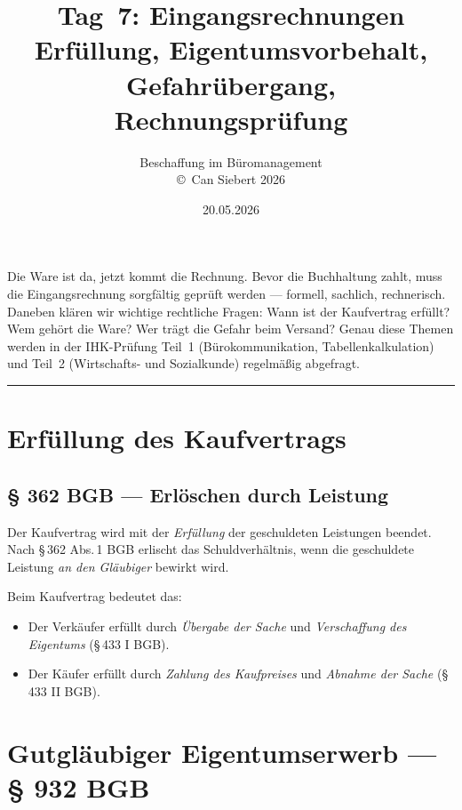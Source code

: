 \documentclass[11pt, a4paper]{article}
\title{\vspace*{-1.5cm}\Huge\bfseries\color{bfwPrimaryDark}Tag~7: Eingangsrechnungen\\[0.4em]
  \large\color{bfwInkSoft}\textnormal{Erfüllung, Eigentumsvorbehalt, Gefahrübergang, Rechnungsprüfung}}
\author{\textsf{Beschaffung im Büromanagement}\\
\textsf{\small\copyright\ Can Siebert\,\textperiodcentered\,2026}}
\date{20.05.2026}
\begin{document}
\maketitle
\thispagestyle{empty}

\vspace{1em}
\begin{merksatz}[title={\bfseries Worum geht es heute?}]
Die Ware ist da, jetzt kommt die Rechnung. Bevor die Buchhaltung zahlt, muss die
Eingangsrechnung sorgfältig geprüft werden --- formell, sachlich, rechnerisch.
Daneben klären wir wichtige rechtliche Fragen: Wann ist der Kaufvertrag erfüllt?
Wem gehört die Ware? Wer trägt die Gefahr beim Versand? Genau diese Themen werden
in der IHK-Prüfung Teil~1 (Bürokommunikation, Tabellenkalkulation) und Teil~2
(Wirtschafts- und Sozialkunde) regelmäßig abgefragt.
\end{merksatz}

\tableofcontents
\vspace{1em}
\hrule
\vspace{1em}

\section{Erfüllung des Kaufvertrags}

\subsection{§ 362 BGB --- Erlöschen durch Leistung}

Der Kaufvertrag wird mit der \emph{Erfüllung} der geschuldeten Leistungen beendet.
Nach §\,362 Abs.\,1 BGB erlischt das Schuldverhältnis, wenn die geschuldete Leistung
\emph{an den Gläubiger} bewirkt wird.

Beim Kaufvertrag bedeutet das:

\begin{itemize}[itemsep=2pt]
  \item Der Verkäufer erfüllt durch \emph{Übergabe der Sache} und \emph{Verschaffung des Eigentums} (§\,433 I BGB).
  \item Der Käufer erfüllt durch \emph{Zahlung des Kaufpreises} und \emph{Abnahme der Sache} (§\,433 II BGB).
\end{itemize}

\section{Gutgläubiger Eigentumserwerb --- § 932 BGB}
\end{document}
